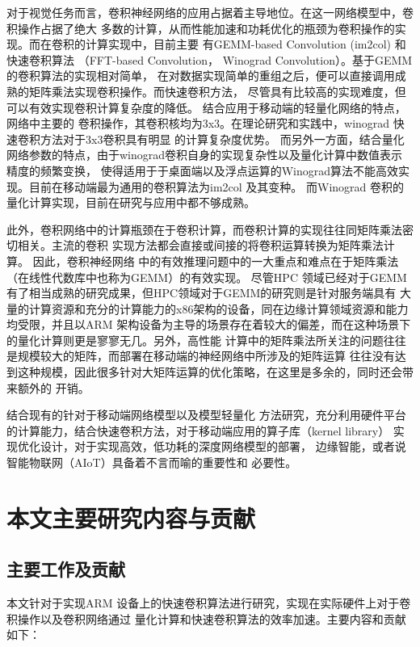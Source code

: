 对于视觉任务而言，卷积神经网络的应用占据着主导地位。在这一网络模型中，卷积操作占据了绝大
多数的计算，从而性能加速和功耗优化的瓶颈为卷积操作的实现。而在卷积的计算实现中，目前主要
有GEMM-based Convolution (im2col) 和快速卷积算法
（FFT-based Convolution， Winograd Convolution）。基于GEMM的卷积算法的实现相对简单，
在对数据实现简单的重组之后，便可以直接调用成熟的矩阵乘法实现卷积操作。而快速卷积方法，
尽管具有比较高的实现难度，但可以有效实现卷积计算复杂度的降低。
结合应用于移动端的轻量化网络的特点，网络中主要的
卷积操作，其卷积核均为3x3。在理论研究和实践中，winograd 快速卷积方法对于3x3卷积具有明显
的计算复杂度优势。
而另外一方面，结合量化网络参数的特点，由于winograd卷积自身的实现复杂性以及量化计算中数值表示精度的频繁变换，
使得适用于于桌面端以及浮点运算的Winograd算法不能高效实现。目前在移动端最为通用的卷积算法为im2col 及其变种。
而Winograd 卷积的量化计算实现，目前在研究与应用中都不够成熟。

此外，卷积网络中的计算瓶颈在于卷积计算，而卷积计算的实现往往同矩阵乘法密切相关。主流的卷积
实现方法都会直接或间接的将卷积运算转换为矩阵乘法计算。 因此，卷积神经网络
中的有效推理问题中的一大重点和难点在于矩阵乘法（在线性代数库中也称为GEMM）的有效实现。
尽管HPC 领域已经对于GEMM有了相当成熟的研究成果，但HPC领域对于GEMM的研究则是针对服务端具有
大量的计算资源和充分的计算能力的x86架构的设备，同在边缘计算领域资源和能力均受限，并且以ARM
架构设备为主导的场景存在着较大的偏差，而在这种场景下的量化计算则更是寥寥无几。另外，高性能
计算中的矩阵乘法所关注的问题往往是规模较大的矩阵，而部署在移动端的神经网络中所涉及的矩阵运算
往往没有达到这种规模，因此很多针对大矩阵运算的优化策略，在这里是多余的，同时还会带来额外的
开销。

结合现有的针对于移动端网络模型以及模型轻量化
方法研究，充分利用硬件平台的计算能力，结合快速卷积方法，对于移动端应用的算子库（kernel library）
实现优化设计，对于实现高效，低功耗的深度网络模型的部署，
边缘智能，或者说智能物联网（AIoT）具备着不言而喻的重要性和
必要性。


\section{本文主要研究内容与贡献}

\subsection{主要工作及贡献}

本文针对于实现ARM 设备上的快速卷积算法进行研究，实现在实际硬件上对于卷积操作以及卷积网络通过
量化计算和快速卷积算法的效率加速。主要内容和贡献如下：

